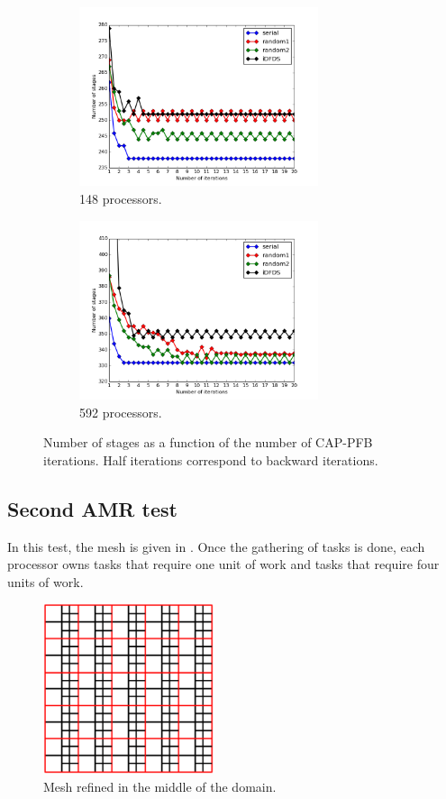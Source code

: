 \documentclass{mc2015}
\renewcommand{\(}{\left(}
\renewcommand{\)}{\right)}
\renewcommand{\[}{\left[}
\renewcommand{\]}{\right]}
\begin{document}
\begin{figure}[H]
  \begin{subfigure}[b]{.5\textwidth}
    \centering
    \includegraphics[width=7cm]{convergence_central_148}
    \caption{148 processors.}
  \label{convergence_central_148}
  \end{subfigure}
  \begin{subfigure}[b]{.5\textwidth}
    \centering
    \includegraphics[width=7cm]{convergence_central_592}
    \caption{592 processors.}
  \label{convergence_central_592}
  \end{subfigure}
  \caption{Number of stages as a function of the number of CAP-PFB iterations.
  Half iterations correspond to backward iterations.}
\end{figure}


\subsection{Second AMR test}

In this test, the mesh is given in . Once the gathering of tasks is
done, each processor owns tasks that require one unit of work and tasks that
require four units of work.
\begin{figure}[H]
  \centering
  \includegraphics[width=5cm]{mesh_2}
  \caption{Mesh refined in the middle of the domain.}
  \label{mesh_2}
\end{figure}
\end{document}
